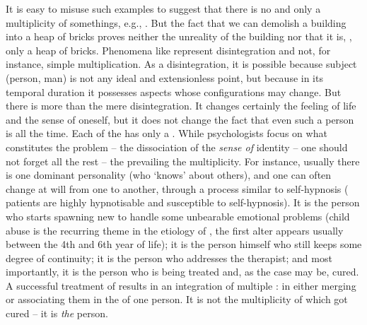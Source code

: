 \pa\label{pa:iDID} It is easy to misuse such examples to suggest that  there is no  and only a multiplicity of somethings, e.g.,
. But the fact that we can demolish a building into a heap of bricks
proves neither the unreality of the building nor that it is, ,
only a heap of bricks. Phenomena like  represent disintegration and
not, for instance, simple multiplication. As a disintegration, it is possible
because subject (person, man) is not any ideal and extensionless point, but
because in its temporal duration it possesses  aspects whose
configurations may change.  But there is more than the mere disintegration.  It
changes certainly the feeling of life and the sense of oneself, but it does not
change the fact that even such a person is  all the time.  Each of
the  has only a .  While
psychologists focus on what constitutes the problem -- the dissociation of the
{\em sense of} identity -- one should not forget all the rest -- the 
prevailing  the  multiplicity.  For instance, usually there
is one dominant personality (who `knows' about others), and one can often change
at will from one to another, through a process similar to self-hypnosis
( patients are highly hypnotisable and susceptible to self-hypnosis).
It is the person  who starts spawning new  to handle some
unbearable emotional problems (child abuse is the recurring theme in the
etiology of , the first alter  appears usually between the 4th
and 6th year of life); it is the person himself who still keeps some degree of
continuity; it is the person
 who addresses the therapist; and most importantly, it is the person
 who is being treated and, as the case may be, cured. A successful
treatment of  results in an integration of multiple : in
either merging or associating them in the  of one person. It is not
the multiplicity of  which got cured -- it is {\em the} person.




